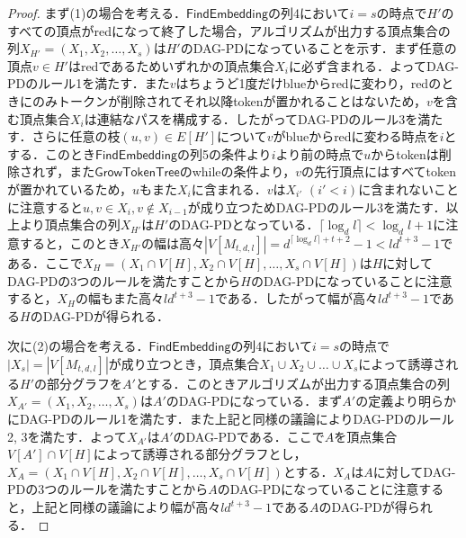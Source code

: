 \documentclass[master]{kuisthesis}		%
\theoremstyle{plain}
\theoremstyle{definition}
\begin{document}
\begin{proof}
まず(1)の場合を考える．$\mathsf{FindEmbedding}$の列4において$i=s$の時点で$H'$のすべての頂点がredになって終了した場合，アルゴリズムが出力する頂点集合の列$X_{H'} = (X_1, X_2, \dots , X_s)$は$H'$のDAG-PDになっていることを示す．まず任意の頂点$v \in H'$はredであるためいずれかの頂点集合$X_i$に必ず含まれる．よってDAG-PDのルール1を満たす．また$v$はちょうど1度だけblueからredに変わり，redのときにのみトークンが削除されてそれ以降tokenが置かれることはないため，$v$を含む頂点集合$X_i$は連結なパスを構成する．したがってDAG-PDのルール3を満たす．さらに任意の枝$(u, v) \in E[H']$について$v$がblueからredに変わる時点を$i$とする．このとき$\mathsf{FindEmbedding}$の列5の条件より$i$より前の時点で$u$からtokenは削除されず，また$\mathsf{GrowTokenTree}$のwhileの条件より，$v$の先行頂点にはすべてtokenが置かれているため，$u$もまた$X_i$に含まれる．$v$は$X_{i'}$ $(i' < i)$に含まれないことに注意すると$u, v \in X_i, v \notin X_{i-1}$が成り立つためDAG-PDのルール3を満たす．以上より頂点集合の列$X_{H'}$は$H'$のDAG-PDとなっている．$\lceil \log_d l \rceil < \log_d l +1$に注意すると，このとき$X_{H'}$の幅は高々$|V[M_{t, d, l}]| = d^{\lceil \log_d l \rceil +t+2}-1 < ld^{t+3}-1$である．ここで$X_H = (X_1 \cap V[H], X_2 \cap V[H], \dots , X_s \cap V[H])$は$H$に対してDAG-PDの3つのルールを満たすことから$H$のDAG-PDになっていることに注意すると，$X_H$の幅もまた高々$ld^{t+3}-1$である．したがって幅が高々$ld^{t+3}-1$である$H$のDAG-PDが得られる．

次に(2)の場合を考える．$\mathsf{FindEmbedding}$の列4において$i=s$の時点で$|X_s| = |V[M_{t, d, l}]|$が成り立つとき，頂点集合$X_1 \cup X_2 \cup \dots \cup X_s$によって誘導される$H'$の部分グラフを$A'$とする．このときアルゴリズムが出力する頂点集合の列$X_{A'} = (X_1, X_2, \dots , X_s)$は$A'$のDAG-PDになっている．まず$A'$の定義より明らかにDAG-PDのルール1を満たす．また上記と同様の議論によりDAG-PDのルール2, 3を満たす．よって$X_{A'}$は$A'$のDAG-PDである．ここで$A$を頂点集合$V[A'] \cap V[H]$によって誘導される部分グラフとし，$X_A = (X_1 \cap V[H], X_2 \cap V[H], \dots , X_s \cap V[H])$とする．$X_A$は$A$に対してDAG-PDの3つのルールを満たすことから$A$のDAG-PDになっていることに注意すると，上記と同様の議論により幅が高々$ld^{t+3}-1$である$A$のDAG-PDが得られる．


\end{proof}
\end{document}
